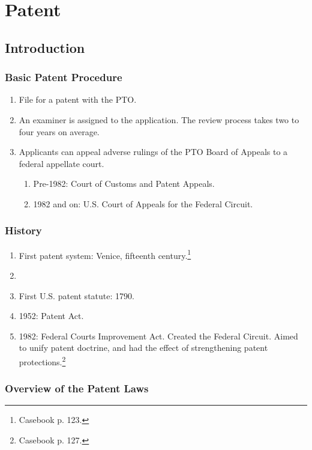 \section{Patent}

\subsection{Introduction}

\subsubsection{Basic Patent Procedure}

\begin{enumerate}
    \item File for a patent with the PTO.
    \item An examiner is assigned to the application. The review process takes 
    two to four years on average.
    \item Applicants can appeal adverse rulings of the PTO Board of Appeals to a 
    federal appellate court.
    \begin{enumerate}
        \item Pre-1982: Court of Customs and Patent Appeals.
        \item 1982 and on: U.S. Court of Appeals for the Federal Circuit.
    \end{enumerate}
\end{enumerate}

\subsubsection{History}

\begin{enumerate}
    \item First patent system: Venice, fifteenth century.\footnote{Casebook p. 
    123.}
    \item 
    \item First U.S. patent statute: 1790.
    \item 1952: Patent Act.
    \item 1982: Federal Courts Improvement Act. Created the Federal Circuit. 
    Aimed to unify patent doctrine, and had the effect of strengthening patent 
    protections.\footnote{Casebook p. 127.}
\end{enumerate}

\subsubsection{Overview of the Patent Laws}

